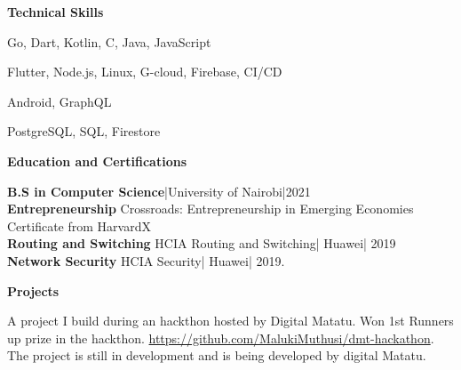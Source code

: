 \documentclass[a4paper]{article}
\begin{document}
\begin{center}
    {\Large \textbf{Technical Skills}}
\end{center}

\begin{description}[noitemsep]
    \item[Languages:] Go, Dart, Kotlin, C, Java, JavaScript
    \item[Platforms and tools:] Flutter, Node.js, Linux, G-cloud, Firebase, CI/CD
    \item[Frameworks:] Android, GraphQL
    \item[Databases:] PostgreSQL, SQL, Firestore
\end{description}

\begin{center}
    {\Large \textbf{Education and Certifications}}
\end{center}

\textbf{B.S in Computer Science}|University of Nairobi|2021 \\
\textbf{Entrepreneurship} Crossroads: Entrepreneurship in Emerging Economies Certificate from HarvardX \\
\textbf{Routing and Switching} HCIA Routing and Switching| Huawei| 2019 \\
\textbf{Network Security} HCIA Security| Huawei| 2019. \par

\begin{center}
    {\Large \textbf{Projects} }
\end{center}

\begin{description}[noitemsep]
    \item[Digital Matatu Fare:] A project I build during an hackthon hosted by Digital Matatu. Won 1st Runners up prize in the hackthon. \url{ https://github.com/MalukiMuthusi/dmt-hackathon}. The project is still in development and is being developed by digital Matatu.
\end{description}

\end{document}

